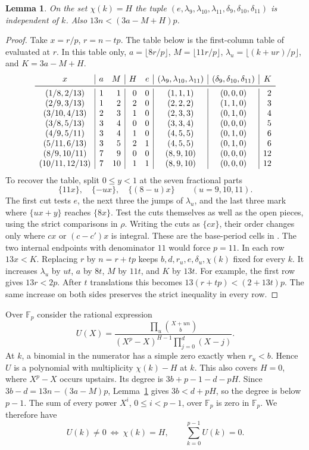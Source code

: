 \documentclass[11pt]{article}
\newtheorem{lemma}[theorem]{Lemma}
\newcommand{\Fp}{\mathbb F_p}
\begin{document}
\begin{lemma}\label{lem:table}
On the set $\chi(k)=H$ the tuple $(e,\lambda_9,\lambda_{10},
\lambda_{11},\delta_9,\delta_{10},\delta_{11})$ is independent of $k$.
Also $13n<(3a-M+H)p$.
\end{lemma}
\begin{proof}
Take $x=r/p$, $r=n-tp$. The table below is the first-column table of \cite{LC} evaluated
at $r$. In this table only, $a=\lfloor8r/p\rfloor$,
$M=\lfloor11r/p\rfloor$, $\lambda_u=\lfloor(k+ur)/p\rfloor$,
and $K=3a-M+H$.
\[
\begin{array}{c|rr|rr|c|c|r}
 x&a&M&H&e&(\lambda_9,\lambda_{10},\lambda_{11})&
      (\delta_9,\delta_{10},\delta_{11})&K\\ \midrule
 (1/8,2/13)&1&1&0&0&(1,1,1)&(0,0,0)&2\\
 (2/9,3/13)&1&2&2&0&(2,2,2)&(1,1,0)&3\\
 (3/10,4/13)&2&3&1&0&(2,3,3)&(0,1,0)&4\\
 (3/8,5/13)&3&4&0&0&(3,3,4)&(0,0,0)&5\\
 (4/9,5/11)&3&4&1&0&(4,5,5)&(0,1,0)&6\\
 (5/11,6/13)&3&5&2&1&(4,5,5)&(0,1,0)&6\\
 (8/9,10/11)&7&9&0&0&(8,9,10)&(0,0,0)&12\\
 (10/11,12/13)&7&10&1&1&(8,9,10)&(0,0,0)&12
\end{array}
\]
To recover the table, split $0\le y<1$ at the seven fractional parts
\[
 \{11x\},\quad \{-ux\},\quad \{(8-u)x\}\qquad (u=9,10,11).
\]
The first cut tests $e$, the next three the jumps of $\lambda_u$,
and the last three mark
where $\{ux+y\}$ reaches $\{8x\}$. Test the cuts themselves as well
as the open pieces, using the strict comparisons in $\rho$.
Writing the cuts as $\{cx\}$, their order changes only where $cx$
or $(c-c')x$ is integral.
These are the base-period cells in \cite{LC}. The two internal
endpoints with denominator $11$ would force $p=11$.
In each row $13x<K$. Replacing $r$ by $n=r+tp$ keeps
$b,d,r_u,e,\delta_u,\chi(k)$ fixed for every $k$. It increases
$\lambda_u$ by $ut$, $a$ by $8t$, $M$ by $11t$, and $K$ by $13t$.
For example, the first row gives $13r<2p$. After $t$
translations this becomes $13(r+tp)<(2+13t)p$. The same increase
on both sides preserves the strict inequality in every row.
\end{proof}

Over $\Fp$ consider the rational expression
\begin{equation}\label{eq:low}
 U(X)=\frac{\prod_u\binom{X+un}{b}}
 {(X^p-X)^{H-1}\prod_{j=0}^d(X-j)} .
\end{equation}
At $k$, a binomial in the numerator has a simple zero exactly when
$r_u<b$. Hence $U$ is a polynomial with multiplicity $\chi(k)-H$
at $k$. This also covers $H=0$, where $X^p-X$ occurs upstairs.
Its degree is $3b+p-1-d-pH$. Since $3b-d=13n-(3a-M)p$,
Lemma~\ref{lem:table} gives $3b<d+pH$, so the degree is below $p-1$. The sum of every power $X^i$, $0\le i<p-1$,
over $\Fp$ is zero in $\Fp$. We therefore have
\begin{equation}\label{eq:zerosum}
 U(k)\ne0\ \Longleftrightarrow\ \chi(k)=H,\qquad
 \sum_{k=0}^{p-1}U(k)=0 .
\end{equation}
\end{document}
